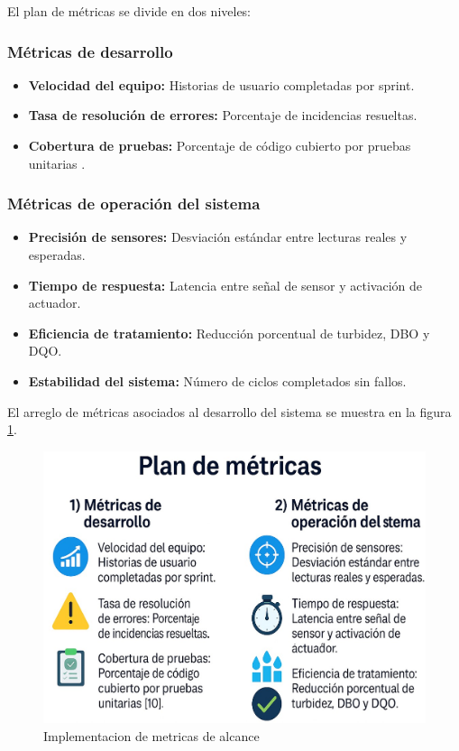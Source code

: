 \documentclass[conference]{IEEEtran}
\begin{document}
	El plan de métricas se divide en dos niveles:
	
	\subsubsection{Métricas de desarrollo}
	
	\begin{itemize}
		\item \textbf{Velocidad del equipo:} Historias de usuario completadas por sprint.
		\item \textbf{Tasa de resolución de errores:} Porcentaje de incidencias resueltas.
		\item \textbf{Cobertura de pruebas:} Porcentaje de código cubierto por pruebas unitarias \cite{b10}.
	\end{itemize}
	
	\subsubsection{Métricas de operación del sistema}
	
	\begin{itemize}
		\item \textbf{Precisión de sensores:} Desviación estándar entre lecturas reales y esperadas.
		\item \textbf{Tiempo de respuesta:} Latencia entre señal de sensor y activación de actuador.
		\item \textbf{Eficiencia de tratamiento:} Reducción porcentual de turbidez, DBO y DQO.
		\item \textbf{Estabilidad del sistema:} Número de ciclos completados sin fallos.
	\end{itemize}
	
	El arreglo de métricas asociados al desarrollo del sistema se muestra en la figura \ref{fig:4}.
	
	\begin{figure}[htbp]
		\centering
		\includegraphics[width=\columnwidth]{fig4.jpg}
		\caption{Implementacion de metricas de alcance}
		\label{fig:4}
	\end{figure}
	
\end{document}
